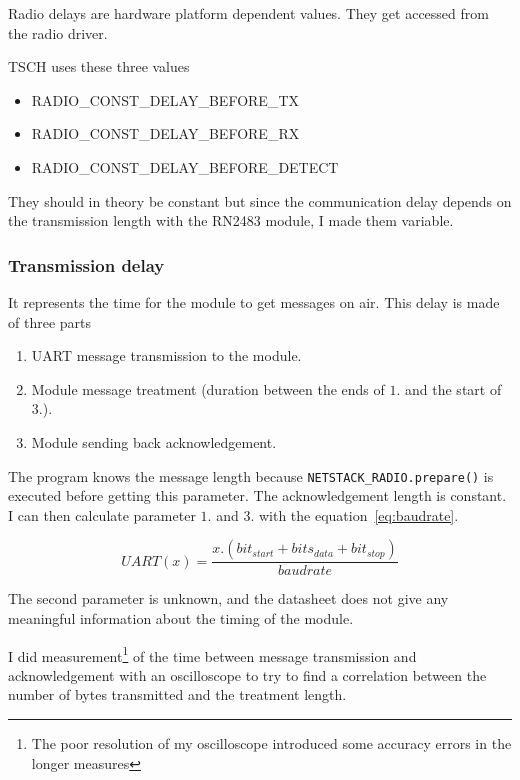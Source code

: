 Radio delays are hardware platform dependent values. 
They get accessed from the radio driver.

TSCH uses these three values

\begin{itemize}
  \item RADIO\_CONST\_DELAY\_BEFORE\_TX
  \item RADIO\_CONST\_DELAY\_BEFORE\_RX
  \item RADIO\_CONST\_DELAY\_BEFORE\_DETECT
\end{itemize}

They should in theory be constant but since the communication delay depends
on the transmission length with the RN2483 module, I made them variable.


\subsubsection{Transmission delay}

It represents the time for the module to get messages on air. 
This delay is made of three parts

\begin{enumerate}
  \item UART message transmission to the module.
  \item Module message treatment (duration between the ends of $1.$ and the start of $3.$).
  \item Module sending back acknowledgement.
\end{enumerate}

The program knows the message length because
\lstinline{NETSTACK_RADIO.prepare()} is executed before getting this parameter.
The acknowledgement length is constant. 
I can then calculate parameter $1.$ and $3.$ with the equation~\ref{eq:baudrate}.

\begin{equation}
  \label{eq:baudrate}
  UART(x) = \frac{x . (bit_{start} + bits_{data} + bit_{stop})}{baudrate}
\end{equation}

The second parameter is unknown, and the datasheet does not give any meaningful
information about the timing of the module.

I did measurement\footnote{The poor resolution of my oscilloscope introduced
some accuracy errors in the longer measures} of the time between message
transmission and acknowledgement with an oscilloscope to try to find a
correlation between the number of bytes transmitted and the treatment length.

